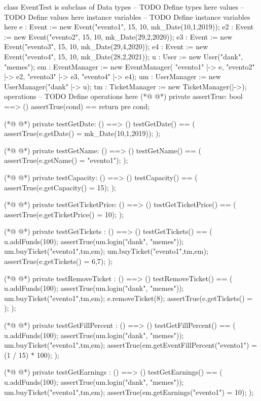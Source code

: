 \begin{vdmpp}[breaklines=true]
class EventTest is subclass of Data
types
-- TODO Define types here
values
-- TODO Define values here
instance variables
-- TODO Define instance variables here
 e : Event := new Event("evento1", 15, 10, mk_Date(10,1,2019));
 e2 : Event := new Event("evento2", 15, 10, mk_Date(29,2,2020));
 e3 : Event := new Event("evento3", 15, 10, mk_Date(29,4,2020));
 e4 : Event := new Event("evento4", 15, 10, mk_Date(28,2,2021));
 u : User := new User("dank", "memes");
 em : EventManager := new EventManager({ "evento1" |-> e, "evento2" |-> e2, "evento3" |-> e3, "evento4" |-> e4});
 um : UserManager := new UserManager({"dank" |-> u});
 tm : TicketManager := new TicketManager({|->});
operations
-- TODO Define operations here
(*@
\label{assertTrue:18}
@*)
 private assertTrue: bool ==> ()
  assertTrue(cond) == return
  pre cond;
  
(*@
\label{testGetDate:22}
@*)
 private testGetDate: () ==> ()
 testGetDate() == (
  assertTrue(e.getDate() = mk_Date(10,1,2019));
 ); 
 
(*@
\label{testGetName:27}
@*)
 private testGetName: () ==> ()
 testGetName() == (
  assertTrue(e.getName() = "evento1");
 );
 
(*@
\label{testCapacity:32}
@*)
 private testCapacity: () ==> ()
 testCapacity() == (
  assertTrue(e.getCapacity() = 15);
 );
 
(*@
\label{testGetTicketPrice:37}
@*)
 private testGetTicketPrice: () ==> ()
 testGetTicketPrice() == (
  assertTrue(e.getTicketPrice() = 10);
 );
 
(*@
\label{testGetTickets:42}
@*)
 private testGetTickets : () ==> ()
 testGetTickets() == (
  u.addFunds(100);
  assertTrue(um.login("dank", "memes"));
  um.buyTicket("evento1",tm,em);
  um.buyTicket("evento1",tm,em);
  assertTrue(e.getTickets() = {6,7});
 );
 
(*@
\label{testRemoveTicket:51}
@*)
 private testRemoveTicket : () ==> ()
 testRemoveTicket() == (
  u.addFunds(100);
  assertTrue(um.login("dank", "memes"));
  um.buyTicket("evento1",tm,em);
  e.removeTicket(8);
  assertTrue(e.getTickets() = {});
 );
 
(*@
\label{testGetFillPercent:60}
@*)
 private testGetFillPercent : () ==> ()
 testGetFillPercent() == (
  u.addFunds(100);
  assertTrue(um.login("dank", "memes"));
  um.buyTicket("evento1",tm,em);
  assertTrue(em.getEventFillPercent("evento1") = (1 / 15) * 100);
 );
 
(*@
\label{testGetEarnings:68}
@*)
 private testGetEarnings : () ==> ()
 testGetEarnings() == (
  u.addFunds(100);
  assertTrue(um.login("dank", "memes"));
  um.buyTicket("evento1",tm,em);
  assertTrue(em.getEarnings("evento1") = 10);
 );
 

\end{vdmpp}
